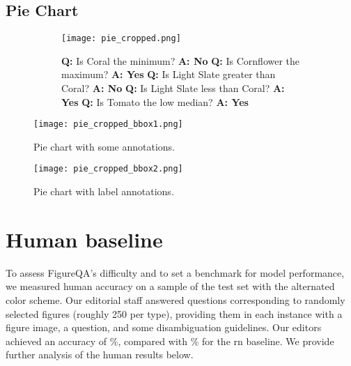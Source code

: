 \documentclass{article} \usepackage{iclr2018_workshop,times}
\begin{document}
\subsection{Pie Chart}
\begin{figure}[h]
    \centering
    \caption{Pie chart with question answer pairs.}
    \label{fig:pie_qa}
    \begin{subfigure}[]{0.6\textwidth}
        \texttt{[image: pie\_cropped.png]}
    \end{subfigure}
    \begin{subfigure}[]{0.38\textwidth}
        \textbf{Q:} Is Coral the minimum?\newline
        \textbf{A: No}\newline\newline
        \textbf{Q:} Is Cornflower the maximum?\newline
        \textbf{A: Yes}\newline\newline
        \textbf{Q:} Is Light Slate greater than Coral?\newline
        \textbf{A: No}\newline\newline
        \textbf{Q:} Is Light Slate less than Coral?\newline
        \textbf{A: Yes}\newline\newline
        \textbf{Q:} Is Tomato the low median?\newline
        \textbf{A: Yes}
    \end{subfigure}
\end{figure}

\begin{SCfigure}[][h]
    \texttt{[image: pie\_cropped\_bbox1.png]}
    \caption{Pie chart with some annotations.}
    \label{fig:pie_anno}
\end{SCfigure}

\begin{SCfigure}[][h]
    \texttt{[image: pie\_cropped\_bbox2.png]}
    \caption{Pie chart with label annotations.}
    \label{fig:pie_anno2}
\end{SCfigure}

\clearpage

\section{Human baseline}
\label{sec:human}
To assess FigureQA's difficulty and to set a benchmark for model performance, we measured human accuracy on a sample of the test set with the alternated color scheme.
Our editorial staff answered  questions corresponding to  randomly selected figures (roughly 250 per type),
providing them in each instance with a figure image, a question, and some disambiguation guidelines.
Our editors achieved an accuracy of \besthumantesttwohuman\%, compared with \bestrntesttwohuman\% for the \gls{rn} \citep{santoro2017simple} baseline.
We provide further analysis of the human results below.
\end{document}
